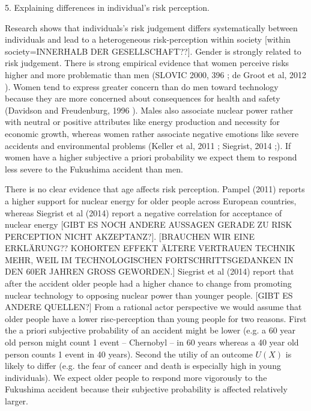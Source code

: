      
5. Explaining differences in individual's risk perception. 

Research shows that  individuals's risk judgement differs systematically between individuals and lead to a heterogeneous risk-perception within society [within society=INNERHALB DER GESELLSCHAFT??]. Gender is strongly related to risk judgement. There is strong empirical evidence that women perceive risks higher and more problematic than men (SLOVIC 2000, 396 \citep[396]{Slovic:2000tx}; de Groot et al, 2012 \citep{deGroot:2012fg}). Women tend to express greater concern than do men toward technology because they are more concerned about consequences for health and safety (Davidson and Freudenburg, 1996 \citep{Davidson:1996uk}).  Males also associate nuclear power rather with neutral or positive attributes like energy production and necessity for economic growth, whereas women rather associate negative emotions like severe accidents and environmental problems (Keller et al, 2011 \citep{Keller:2011gb}; Siegrist, 2014 \citep{Siegrist:2014ji};). If women have a higher subjective a priori probability we expect them to respond less severe to the Fukushima accident than men.

There is no clear evidence that age affects risk perception. Pampel (2011) \citep{Pampel:2011cx} reports a higher support for nuclear energy for older people across European countries, whereas Siegrist et al (2014) report a negative correlation for acceptance of nuclear energy [GIBT ES NOCH ANDERE AUSSAGEN GERADE ZU RISK PERCEPTION NICHT AKZEPTANZ?]. [BRAUCHEN WIR EINE ERKLÄRUNG?? KOHORTEN EFFEKT ÄLTERE VERTRAUEN TECHNIK MEHR, WEIL IM TECHNOLOGISCHEN FORTSCHRITTSGEDANKEN IN DEN 60ER JAHREN GROSS GEWORDEN.] Siegrist et al (2014) \citep{Siegrist:2014ji} report that after the accident older people had a higher chance to change from promoting nuclear technology to opposing nuclear power than younger people.  [GIBT ES ANDERE QUELLEN?] From a rational actor perspective we would assume that older people have a lower risc-perception than young people for two reasons.  First the a priori subjective probability of an accident might be lower (e.g. a 60 year old person might count 1 event -- Chernobyl -- in 60 years whereas a 40 year old person counts 1 event in 40 years). Second the utiliy of an outcome $U(X)$ is likely to differ (e.g. the fear of cancer and death is especially high in young individuals). We expect older people to respond more vigorously to the Fukushima accident because their subjective probability is affected relatively larger.
                      
